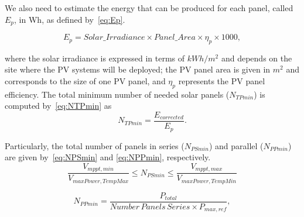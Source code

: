 \documentclass[10pt,conference]{IEEEtran}
\begin{document}
We also need to estimate the energy that can be produced for each panel, called $E_{p}$, in Wh, as defined by~\eqref{eq:Ep}.

\begin{equation}
\label{eq:Ep}
\scriptstyle E_{p} = \scriptstyle Solar\_Irradiance \times Panel\_Area \times \eta_{p} \times 1000,
\end{equation}

\noindent where the solar irradiance is expressed in terms of $kWh/m^{2}$ and depends on the site where the PV systems will be deployed; the PV panel area is given in $m^{2}$ and corresponds to the size of one PV panel, and $\eta_{p}$ represents the PV panel efficiency.
%
The total minimum number of needed solar panels ($N_{TPmin}$) is computed by~\eqref{eq:NTPmin} as
\begin{equation}
\label{eq:NTPmin}
\scriptstyle N_{TPmin} = \dfrac{\scriptstyle E_{corrected}}{\scriptstyle E_{p}}.
\end{equation}

Particularly, the total number of panels in series ($N_{PSmin}$) and parallel ($N_{PPmin}$) are given by~\eqref{eq:NPSmin} and \eqref{eq:NPPmin}, respectively.  
%
\begin{equation}
\label{eq:NPSmin}
\dfrac{\scriptstyle V_{mppt,min}}{\scriptstyle V_{maxPower,TempMax}} \scriptstyle \leq \scriptstyle N_{PSmin} \leq \dfrac{\scriptstyle V_{mppt,max}}{\scriptstyle V_{maxPower,TempMin}}
\end{equation}

\begin{equation}
\label{eq:NPPmin}
\scriptstyle N_{PPmin} = \dfrac{\scriptstyle P_{total}}{\scriptstyle Number\,Panels\,Series \scriptstyle \times \scriptstyle P_{max,ref}},
\end{equation}
\end{document}
